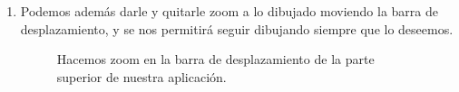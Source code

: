 \begin{enumerate}
        \item Podemos además darle y quitarle zoom a lo dibujado moviendo la barra de desplazamiento, y se nos permitirá seguir dibujando siempre que lo deseemos.        
         \begin{figure}[H]
            \caption{Hacemos zoom en la barra de desplazamiento de la parte superior de nuestra aplicación.} \label{fig:incre}
        \end{figure}
        

\end{enumerate}
